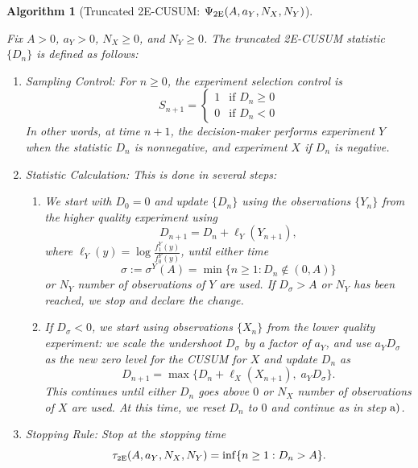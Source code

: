 \documentclass[journal, onecolumn]{IEEEtran}
\newtheorem{algorithm}{Algorithm}
\begin{document}
\begin{algorithm}[Truncated 2E-CUSUM: $\Psi_{\textup{2E}} (A, a_Y, N_X, N_Y)$]
\label{alg:truncated_2e-cusum}

Fix $A > 0$, $a_Y > 0$, $N_X \geq 0$, and $N_Y \geq 0$. The truncated \textup{2E-CUSUM} statistic $\{ D_n \}$ is defined as follows:

\begin{enumerate}
\item Sampling Control: For $n \geq 0$, the experiment selection control is
$$ S_{n + 1} =
\left\{
\begin{array}{ll}
1 & \text{if } D_n \geq 0 \\
0 & \text{if } D_n < 0
\end{array}
\right. $$
In other words, at time $n + 1$, the decision-maker performs experiment $Y$ when the statistic $D_n$ is nonnegative, and experiment $X$ if $D_n$ is negative.

\item Statistic Calculation: This is done in several steps:

    \begin{enumerate}
    \item We start with $D_0 = 0$ and update $\{ D_n \}$ using the observations $\{ Y_n \}$ from the higher quality experiment using
    $$ D_{n + 1}  = D_n + \ell_Y (Y_{n + 1}), $$
    where $\ell_Y (y) = \log \frac{f_1^Y (y)}{f_0^Y (y)}$, until either time
    $$ \sigma := \sigma^Y(A) = \min \{ n \geq 1: D_n \notin (0, A) \} $$
    or $N_Y$ number of observations of $Y$ are used. If $D_\sigma > A$ or $N_Y$ has been reached, we stop and declare the change.
    
    \item If $D_\sigma < 0$, we start using observations $\{ X_n \}$ from the lower quality experiment: we scale the  undershoot $D_\sigma$ by a factor of $a_Y$, and use $a_Y D_\sigma$ as the new zero level for the \textup{CUSUM} for $X$ and update $D_n$ as
    $$ D_{n + 1} = \max \{ D_n + \ell_X (X_{n + 1}), \;  a_Y D_\sigma \}. $$
    This continues until either $D_n$ goes above $0$ or $N_X$ number of observations of $X$ are used. At this time, we reset $D_n$ to $0$ and continue as in step $\textup{a)}$.
    \end{enumerate}

\item Stopping Rule: Stop at the stopping time
$$ \tau_{\textup{\fontsize{6 pt}{10 pt}\selectfont 2E}}(A, a_Y, N_X, N_Y) = \inf \{ n \geq 1: D_n > A \}. $$
\end{enumerate}    
\end{algorithm}
\end{document}
